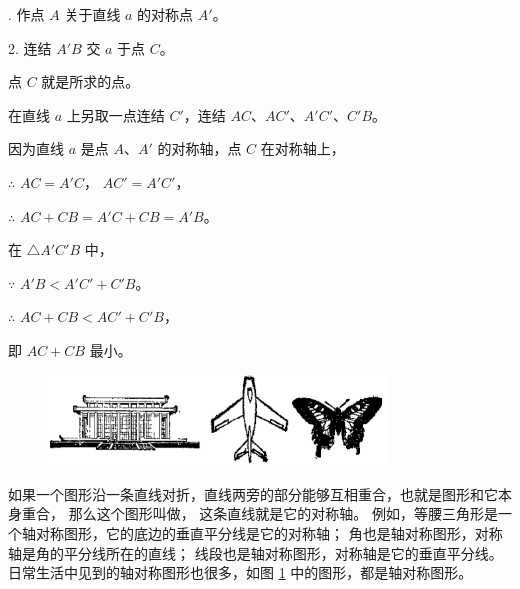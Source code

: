 . 作点 $A$ 关于直线 $a$ 的对称点 $A'$。

2. 连结 $A'B$ 交 $a$ 于点 $C$。

点 $C$ 就是所求的点。

\zhengming 在直线 $a$ 上另取一点连结 $C'$，连结 $AC$、$AC'$、$A'C'$、$C'B$。

因为直线 $a$ 是点 $A$、$A'$ 的对称轴，点 $C$ 在对称轴上，

$\therefore$ \quad $AC = A'C$， $AC' = A'C'$，

$\therefore$ \quad $AC + CB = A'C + CB = A'B$。

在 $\triangle A'C'B$ 中，

$\because$ \quad $A'B < A'C' + C'B$。

$\therefore$ \quad $AC + CB < AC' + C'B$，

即 \quad $AC + CB$ 最小。

\begin{figure}[htbp]
    \centering
    \begin{minipage}[b]{4.5cm}
        \centering
        
        \caption{}\label{fig:czjh1-3-63}
    \end{minipage}
    \qquad
    \begin{minipage}[b]{9.5cm}
        \centering
        \includegraphics[width=9cm]{../pic/czjh1-ch3-64.png}
        \caption{}\label{fig:czjh1-3-64}
        \end{minipage}
\end{figure}

如果一个图形沿一条直线对折，直线两旁的部分能够互相重合，也就是图形和它本身重合，
那么这个图形叫做， 这条直线就是它的对称轴。
例如，等腰三角形是一个轴对称图形，它的底边的垂直平分线是它的对称轴；
角也是轴对称图形，对称轴是角的平分线所在的直线；
线段也是轴对称图形，对称轴是它的垂直平分线。
日常生活中见到的轴对称图形也很多，如图 \ref{fig:czjh1-3-64} 中的图形，都是轴对称图形。

\begin{lianxi}




\end{lianxi}

